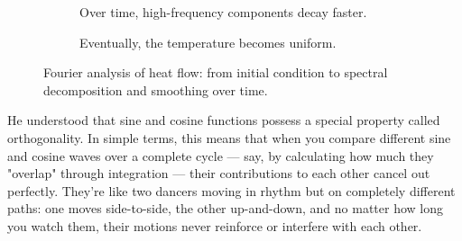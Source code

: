 \begin{figure}[H]
  \begin{subfigure}[t]{0.45\textwidth}
    \centering
    \caption{Over time, high-frequency components decay faster.}
  \end{subfigure}
  \hfill
  \begin{subfigure}[t]{0.45\textwidth}
    \centering
    \caption{Eventually, the temperature becomes uniform.}
  \end{subfigure}

  \caption{Fourier analysis of heat flow: from initial condition to spectral decomposition and smoothing over time.}
\end{figure}


He understood that sine and cosine functions possess a special property called orthogonality. In simple terms, this means that when you compare different sine and cosine waves over a complete cycle — say, by calculating how much they "overlap" through integration — their contributions to each other cancel out perfectly. They’re like two dancers moving in rhythm but on completely different paths: one moves side-to-side, the other up-and-down, and no matter how long you watch them, their motions never reinforce or interfere with each other.

